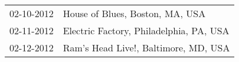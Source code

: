 \begin{supertabular}{ll}
 02-10-2012 &          House of Blues, Boston, MA, USA \\
 02-11-2012 &  Electric Factory, Philadelphia, PA, USA \\
 02-12-2012 &     Ram's Head Live!, Baltimore, MD, USA \\
\end{supertabular}
